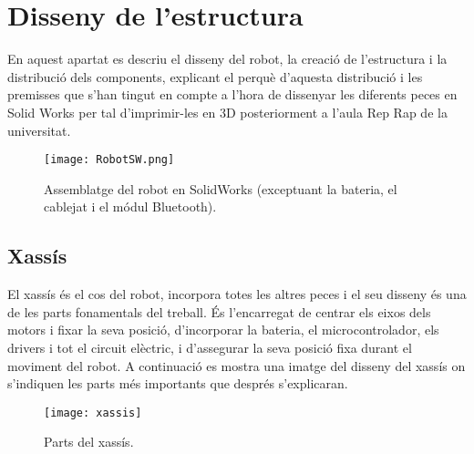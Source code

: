 \setlength\topmargin{8mm}
\onehalfspacing
\chapter{Disseny de l'estructura} %

\label{Chapter4} %


En aquest apartat es descriu el disseny del robot, la creació de l’estructura i la distribució dels components, explicant el perquè d’aquesta distribució i les premisses que s’han tingut en compte a l'hora de dissenyar les diferents peces en Solid Works \cite{SWbib} per tal d'imprimir-les en 3D posteriorment a l'aula Rep Rap de la universitat.   

\begin{figure}[H]
	\centering
	\texttt{[image: RobotSW.png]}
	\caption{Assemblatge del robot en SolidWorks (exceptuant la bateria, el cablejat i el módul Bluetooth).}
	\label{fig:RobotSW}
\end{figure}

\section{Xassís}

El xassís és el cos del robot, incorpora totes les altres peces i el seu disseny és una de les parts fonamentals del treball. És l’encarregat de centrar els eixos dels motors i fixar la seva posició, d’incorporar la bateria, el microcontrolador, els drivers i tot el circuit elèctric, i d'assegurar la seva posició fixa durant el moviment del robot. A continuació es mostra una imatge del disseny del xassís on s'indiquen les parts més importants que després s'explicaran. 

\begin{figure}[H]
	\centering
	\texttt{[image: xassis]}
	\caption{Parts del xassís.}
	\label{fig:xassis}
\end{figure}

